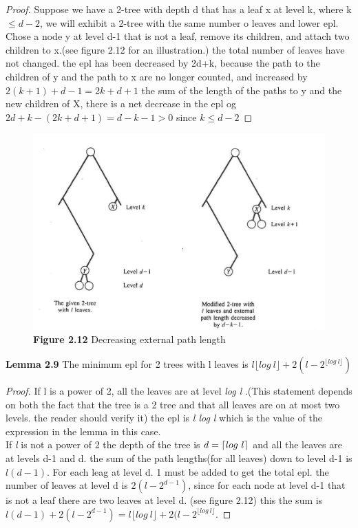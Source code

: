 \documentclass[a4paper,10pt,titlepage]{report}
\DeclarePairedDelimiter{\ceil}{\lceil}{\rceil}
\begin{document}
\begin{proof}
Suppose we have a 2-tree with depth d that has a leaf x at level k, where k$ \leq d-2$, we will exhibit a 2-tree with the same number o leaves and lower epl.\\ Chose a node y at level d-1 that is not a leaf, remove its children, and attach two children to x.(see figure 2.12 for an illustration.) the total number of leaves have not changed. the epl has been decreased by 2d+k, because the path to the children of y and the path to x are no longer counted, and increased by $2(k+1)+d-1 = 2k+d+1$ the sum of the length of the paths to y and the new children of X, there is a net decrease in the epl og $2d+k-(2k+d+1) = d-k-1 > 0 $ since $k\leq d-2$
\end{proof} 
\vspace{5mm}
\begin{figure}[h]
\includegraphics[scale=0.3]{notes_2_12.png}
\caption{\textbf{Figure 2.12} Decreasing external path length}
\end{figure}
\vspace{5mm}
\textbf{Lemma 2.9} The minimum epl for 2 trees with l leaves is $l \lfloor{log \ l}\rfloor+ 2(l-2^{\lfloor log \ l\rfloor})$

\begin{proof}
If l is a power of 2, all the leaves are at level \textit{log l} .(This statement depends on both the fact that the tree is a 2 tree and that all leaves are on at most two levels. the reader should verify it) the epl is \textit{l log l} which is the value of the expression in the lemma in this case.\\
If \textit{l} is not a power of 2 the depth of the tree is $d = \ceil{log \ l} $ and all the leaves are at levels d-1 and d. the sum of the path lengths(for all leaves) down to level d-1 is $l(d-1)$. For each leag at level d. 1 must be added to get the total epl. the number of leaves at level d is $2(l-2^{d-1})$, since for each node at level d-1 that is not a leaf there are two leaves at level d. (see figure 2.12) this the sum is $l(d-1)+2(l-2^{d-1}) = l \lfloor log \ l \rfloor +2(l-2^{\lfloor log \ l \rfloor}$. 
\end{proof}
\vspace{5mm}
\end{document}
